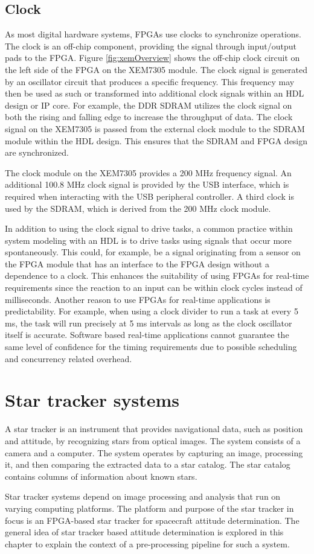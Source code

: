 \documentclass[12pt]{report}
\begin{document}
\section{Clock}
As most digital hardware systems, FPGAs use clocks to synchronize operations. The clock is an off-chip component, providing the signal through input/output pads to the FPGA. Figure \ref{fig:xemOverview} shows the off-chip clock circuit on the left side of the FPGA on the XEM7305 module. The clock signal is generated by an oscillator circuit that produces a specific frequency. This frequency may then be used as such or transformed into additional clock signals within an HDL design or IP core. For example, the DDR SDRAM utilizes the clock signal on both the rising and falling edge to increase the throughput of data. The clock signal on the XEM7305 is passed from the external clock module to the SDRAM module within the HDL design. This ensures that the SDRAM and FPGA design are synchronized. \citep{XEM7305Man}
\par
The clock module on the XEM7305 provides a 200 MHz frequency signal. An additional 100.8 MHz clock signal is provided by the USB interface, which is required when interacting with the USB peripheral controller. A third clock is used by the SDRAM, which is derived from the 200 MHz clock module. \citep{XEM7305Man}
\par
In addition to using the clock signal to drive tasks, a common practice within system modeling with an HDL is to drive tasks using signals that occur more spontaneously. This could, for example, be a signal originating from a sensor on the FPGA module that has an interface to the FPGA design without a dependence to a clock. This enhances the suitability of using FPGAs for real-time requirements since the reaction to an input can be within clock cycles instead of milliseconds. Another reason to use FPGAs for real-time applications is predictability. For example, when using a clock divider to run a task at every 5 ms, the task will run precisely at 5 ms intervals as long as the clock oscillator itself is accurate. Software based real-time applications cannot guarantee the same level of confidence for the timing requirements due to possible scheduling and concurrency related overhead.

\chapter{Star tracker systems}
A star tracker is an instrument that provides navigational data, such as position and attitude, by recognizing stars from optical images. The system consists of a camera and a computer. The system operates by capturing an image, processing it, and then comparing the extracted data to a star catalog. The star catalog contains columns of information about known stars. \citep{SatDesgin}
\par
Star tracker systems depend on image processing and analysis that run on varying computing platforms. The platform and purpose of the star tracker in focus is an FPGA-based star tracker for spacecraft attitude determination. The general idea of star tracker based attitude determination is explored in this chapter to explain the context of a pre-processing pipeline for such a system.
\end{document}
